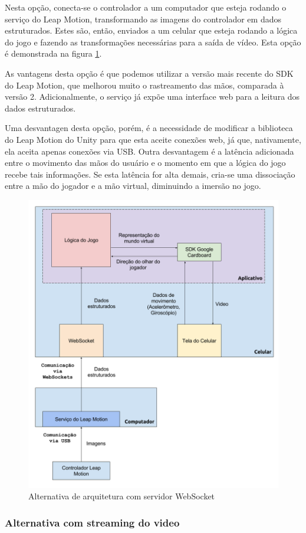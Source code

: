 Nesta opção, conecta-se o controlador a um computador que esteja rodando o serviço do Leap Motion, transformando as imagens do controlador em dados estruturados. Estes são, então, enviados a um celular que esteja rodando a lógica do jogo e fazendo as transformações necessárias para a saída de vídeo. Esta opção é demonstrada na figura \ref{fig:arquitetura-leap-pc-leapdata-android}.

As vantagens desta opção é que podemos utilizar a versão mais recente do SDK do Leap Motion, que melhorou muito o rastreamento das mãos, comparada à versão 2. Adicionalmente, o serviço já expõe uma interface web para a leitura dos dados estruturados. 

Uma desvantagen desta opção, porém, é a necessidade de modificar a biblioteca do Leap Motion do Unity para que esta aceite conexões web, já que, nativamente, ela aceita apenas conexões via USB. Outra desvantagem é a latência adicionada entre o movimento das mãos do usuário e o momento em que a lógica do jogo recebe tais informações. Se esta latência for alta demais, cria-se uma dissociação entre a mão do jogador e a mão virtual, diminuindo a imersão no jogo.

\begin{figure}
	\centering
	\includegraphics[width=0.7\linewidth]{images/Arquitetura-leap-pc-leapdata-android}
	\caption{Alternativa de arquitetura com servidor WebSocket}
	\label{fig:arquitetura-leap-pc-leapdata-android}
\end{figure}

\subsubsection{Alternativa com streaming do video}\label{subsubsec-arquiteturas-leapmotion-pc-riftcat-android}

